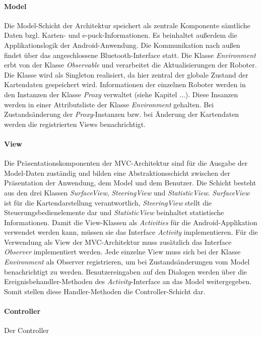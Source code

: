 \documentclass[10pt,a4paper]{article}
\begin{document}
			\paragraph*{Model}
  				Die Model-Schicht der Architektur speichert als zentrale Komponente sämtliche Daten bzgl. Karten- und e-puck-Informationen.
  				Es  beinhaltet außerdem die Applikationslogik der Android-Anwendung. Die Kommunikation nach außen findet über das
  				angeschlossene Bluetooth-Interface statt. Die Klasse \textit{Environment} erbt von der Klasse \textit{Observable} und verarbeitet
  				die Aktualisierungen der Roboter. Die Klasse wird als Singleton realisiert, da hier zentral der globale Zustand der Kartendaten
  				gespeichert wird. Informationen der einzelnen Roboter werden in den Instanzen der Klasse \textit{Proxy} verwaltet (siehe Kapitel
  				...). Diese Insanzen werden in einer Attributsliste der Klasse \textit{Environment} gehalten. Bei Zustandsänderung der
  				\textit{Proxy}-Instanzen bzw. bei Änderung der Kartendaten werden die registrierten Views benachrichtigt.
  			\paragraph*{View}
  				Die Präsentationskomponenten der MVC-Architektur sind für die Ausgabe der Model-Daten zuständig und bilden eine
  				Abstraktionsschicht zwischen der Präsentation der Anwendung, dem Model und dem Benutzer. Die Schicht besteht aus den drei
  				Klassen	\textit{SurfaceView}, \textit{SteeringView} und \textit{StatisticView}. \textit{SurfaceView} ist für die Kartendarstellung
  				verantwortlich, \textit{SteeringView} stellt die Steuerungsbedienelemente dar und \textit{StatisticView} beinhaltet statistische
  				Informationen.  Damit die View-Klassen als \textit{Activities} für die Android-Applikation verwendet werden kann, müssen sie
  				das Interface \textit{Activity} implementieren. Für die Verwendung als View der MVC-Architektur muss zusätzlich das Interface
  				\textit{Observer} implementiert werden. Jede einzelne View muss sich bei der Klasse \textit{Environment} als Observer
  				registrieren, um bei Zustandsänderungen vom Model benachrichtigt zu werden. Benutzereingaben auf den Dialogen werden über
  				die Ereignisbehandler-Methoden des \textit{Activity}-Interface an das Model weitergegeben. Somit stellen diese Handler-Methoden
  				die Controller-Schicht dar.
  			\paragraph*{Controller}
  				Der Controller 
\end{document}
